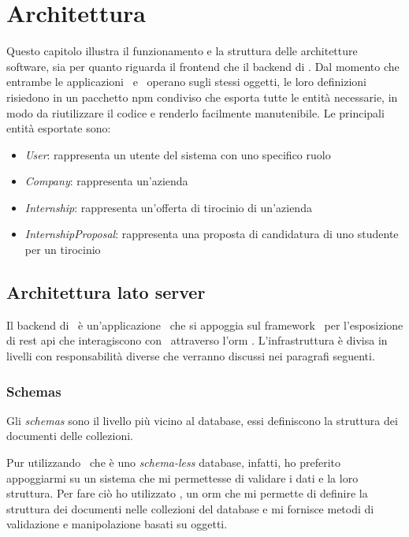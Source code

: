 \chapter{Architettura}

Questo capitolo illustra il funzionamento e la struttura delle architetture software, sia per quanto riguarda il \gls{frontend} che il \gls{backend} di \projectName. Dal momento che entrambe le applicazioni \angular~e \nodejs~operano sugli stessi oggetti, le loro definizioni risiedono in un pacchetto \gls{npm} condiviso che esporta tutte le entità necessarie, in modo da riutilizzare il codice e renderlo facilmente manutenibile. Le principali entità esportate sono:
\begin{itemize}
	\item \textit{User}: rappresenta un utente del sistema con uno specifico ruolo
	\item \textit{Company}: rappresenta un'azienda
	\item \textit{Internship}: rappresenta un'offerta di tirocinio di un'azienda
	\item \textit{InternshipProposal}: rappresenta una proposta di candidatura di uno studente per un tirocinio
\end{itemize}

\section{Architettura lato server}

Il \gls{backend} di \projectName~è un'applicazione \nodejs~che si appoggia sul \gls{framework} \expressjs~per l'esposizione di \acrshort{rest} \acrshort{api} che interagiscono con \mongodb~attraverso l'\acrshort{orm} \mongoosejs. 
L'infrastruttura è divisa in livelli con responsabilità diverse che verranno discussi nei paragrafi seguenti.

\subsection{Schemas}

Gli \textit{schemas} sono il livello più vicino al database, essi definiscono la struttura dei documenti delle collezioni.

Pur utilizzando \mongodb~che è uno \textit{schema-less} database, infatti, ho preferito appoggiarmi su un sistema che mi permettesse di validare i dati e la loro struttura. Per fare ciò ho utilizzato \mongoosejs, un \gls{orm} che mi permette di definire la struttura dei documenti nelle collezioni del database e mi fornisce metodi di validazione e manipolazione basati su oggetti.


